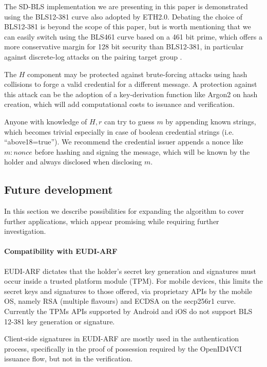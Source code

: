 The SD-BLS implementation we are presenting in this paper is
demonstrated using the BLS12-381 curve \cite{bls381-12} also adopted
by ETH2.0. Debating the choice of BLS12-381 is beyond the scope of
this paper, but is worth mentioning that we can easily switch using
the BLS461 curve based on a 461 bit prime, which offers a more
conservative margin for 128 bit security than BLS12-381, in particular
against discrete-log attacks on the pairing target group
\cite{discrete-log-attack}.

The $H$ component may be protected against brute-forcing attacks using
hash collisions to forge a valid credential for a different message. A
protection against this attack can be the adoption of a key-derivation
function like Argon2 \cite{argon2} on hash creation, which will add
computational costs to issuance and verification.

Anyone with knowledge of $H,r$ can try to guess $m$ by appending known
strings, which becomes trivial especially in case of boolean
credential strings (i.e. ``above18=true''). We recommend the
credential issuer appends a nonce like $m:nonce$ before hashing and
signing the message, which will be known by the holder and always
disclosed when disclosing $m$.

\subsection{Future development}

In this section we describe possibilities for expanding the algorithm
to cover further applications, which appear promising while requiring
further investigation.

\paragraph{Compatibility with EUDI-ARF}

EUDI-ARF dictates that the holder's secret key generation and
signatures must occur inside a trusted platform module (TPM). For
mobile devices, this limits the secret keys and signatures to those
offered, via proprietary APIs by the mobile OS, namely RSA (multiple
flavours) and ECDSA on the secp256r1 curve. Currently the TPMs APIs
supported by Android and iOS do not support BLS 12-381 key generation
or signature.

Client-side signatures in EUDI-ARF are mostly used in the
authentication process, specifically in the proof of possession
required by the OpenID4VCI\cite{OID4VCI} issuance flow, but not in the
verification.

